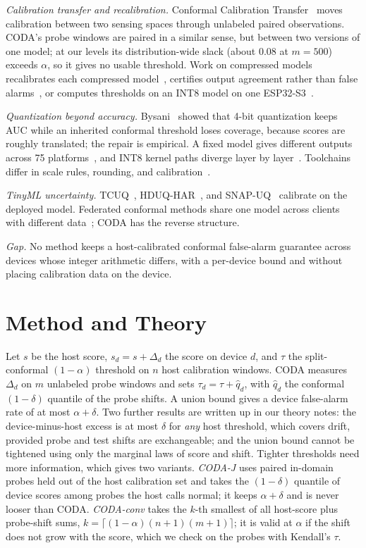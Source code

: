 \documentclass[conference]{IEEEtran}
\begin{document}
\emph{Calibration transfer and recalibration.} Conformal Calibration Transfer~\cite{doula2026} moves calibration between two sensing spaces through unlabeled paired observations. CODA's probe windows are paired in a similar sense, but between two versions of one model; at our levels its distribution-wide slack (about 0.08 at $m=500$) exceeds $\alpha$, so it gives no usable threshold. Work on compressed models recalibrates each compressed model~\cite{tong2026,salem2026}, certifies output agreement rather than false alarms~\cite{zhou2026}, or computes thresholds on an INT8 model on one ESP32-S3~\cite{elallam2026}.

\emph{Quantization beyond accuracy.} Bysani~\cite{bysani2026} showed that 4-bit quantization keeps AUC while an inherited conformal threshold loses coverage, because scores are roughly translated; the repair is empirical. A fixed model gives different outputs across 75 platforms~\cite{schlogl2023}, and INT8 kernel paths diverge layer by layer~\cite{chen2026alibi}. Toolchains differ in scale rules, rounding, and calibration~\cite{jacob2018,krishnamoorthi2018,nagel2021,espppq}.

\emph{TinyML uncertainty.} TCUQ~\cite{lamaakal2025tcuq}, HDUQ-HAR~\cite{lamaakal2026hduq}, and SNAP-UQ~\cite{lamaakal2026snapuq} calibrate on the deployed model. Federated conformal methods share one model across clients with different data~\cite{lu2023,humbert2023}; CODA has the reverse structure.

\emph{Gap.} No method keeps a host-calibrated conformal false-alarm guarantee across devices whose integer arithmetic differs, with a per-device bound and without placing calibration data on the device.

\section{Method and Theory}\label{sec:theory}
Let $s$ be the host score, $s_d=s+\Delta_d$ the score on device $d$, and $\tau$ the split-conformal $(1-\alpha)$ threshold on $n$ host calibration windows. CODA measures $\Delta_d$ on $m$ unlabeled probe windows and sets $\tau_d=\tau+\hat q_d$, with $\hat q_d$ the conformal $(1-\delta)$ quantile of the probe shifts. A union bound gives a device false-alarm rate of at most $\alpha+\delta$. Two further results are written up in our theory notes: the device-minus-host excess is at most $\delta$ for \emph{any} host threshold, which covers drift, provided probe and test shifts are exchangeable; and the union bound cannot be tightened using only the marginal laws of score and shift. Tighter thresholds need more information, which gives two variants. \emph{CODA-J} uses paired in-domain probes held out of the host calibration set and takes the $(1-\delta)$ quantile of device scores among probes the host calls normal; it keeps $\alpha+\delta$ and is never looser than CODA. \emph{CODA-conv} takes the $k$-th smallest of all host-score plus probe-shift sums, $k=\lceil(1-\alpha)(n+1)(m+1)\rceil$; it is valid at $\alpha$ if the shift does not grow with the score, which we check on the probes with Kendall's $\tau$.
\end{document}
